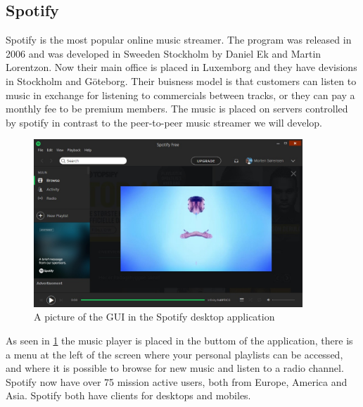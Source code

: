 \subsection{Spotify}
Spotify is the most popular online music streamer. The program was released in 2006 and was developed in Sweeden Stockholm by Daniel Ek and Martin Lorentzon. Now their main office is placed in Luxemborg and they have devisions in Stockholm and Göteborg. Their buisness model is that customers can listen to music in exchange for listening to commercials between tracks, or they can pay a monthly fee to be premium members.
The music is placed on servers controlled by spotify in contrast to the peer-to-peer music streamer we will develop.
\begin{figure}[h]
  \centering
    \includegraphics[width=0.9\textwidth]{gfx/Spotify_desktop.jpg}
  \caption{A picture of the GUI in the Spotify desktop application}
  \label{fig:spotify}
\end{figure}
As seen in \ref{fig:spotify} the music player is placed in the buttom of the application, there is a menu at the left of the screen where your personal playlists can be accessed, and where it is possible to browse for new music and listen to a radio channel.
Spotify now have over 75 mission active users, both from Europe, America and Asia. Spotify both have clients for desktops and mobiles.

